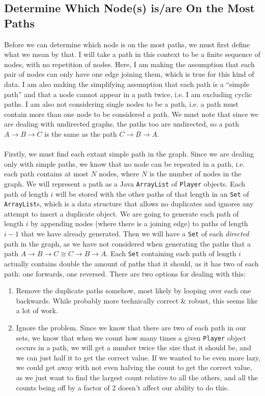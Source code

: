 \documentclass[a4paper,11pt]{article}
\begin{document}
\subsection{Determine Which Node(s) is/are On the Most Paths}
Before we can determine which node is on the most paths, we must first define what we mean by that.
I will take a path in this context to be a finite sequence of nodes, with no repetition of nodes.
Here, I am making the assumption that each pair of nodes can only have one edge joining them, which is true for this kind of data.
I am also making the simplifying assumption that each path is a ``simple path'' and that a node cannot appear in a path twice, i.e. I am excluding cyclic paths.
I am also not considering single nodes to be a path, i.e. a path must contain more than one node to be considered a path.
We must note that since we are dealing with undirected graphs, the paths too are undirected, so a path $A \rightarrow B \rightarrow C$ is the same as the path 
$C \rightarrow B \rightarrow A$.
\\\\
Firstly, we must find each extant simple path in the graph. 
Since we are dealing only with simple paths, we know that no node can be repeated in a path, i.e. each path contains at most $N$ nodes, where $N$ is the 
number of nodes in the graph. 
We will represent a path as a Java \texttt{ArrayList} of \texttt{Player} objects. 
Each path of length $i$ will be stored with the other paths of that length in an \texttt{Set} of \texttt{ArrayList}s, which is a data structure that allows no
duplicates and ignores any attempt to insert a duplicate object.
We are going to generate each path of length $i$ by appending nodes (where there is a joining edge) to paths of length $i-1$ that we have already generated.
Then we will have a \texttt{Set} of each \emph{directed} path in the graph, as we have not considered when generating the paths that a path $A \rightarrow B \rightarrow C \cong
C \rightarrow B \rightarrow A$. 
Each \texttt{Set} containing each path of length $i$ actually contains double the amount of paths that it should, as it has two of each path: one forwards, one reversed.
There are two options for dealing with this: 
\begin{enumerate}
    \item   Remove the duplicate paths somehow, most likely by looping over each one backwards.
            While probably more technically correct \& robust, this seems like a lot of work.

    \item   Ignore the problem.
            Since we know that there are two of each path in our sets, we know that when we count how many times a given \texttt{Player} object occurs in a path, we will get a 
            number twice the size that it should be, and we can just half it to get the correct value.
            If we wanted to be even more lazy, we could get away with not even halving the count to get the correct value, as we just want to find the largest count relative to all the others,
            and all the counts being off by a factor of $2$ doesn't affect our ability to do this.
\end{enumerate}
\end{document}
